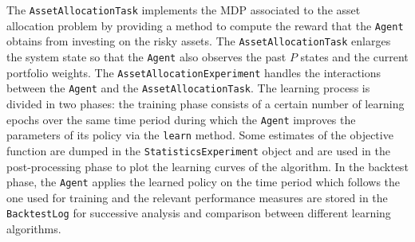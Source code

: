 \clearpage
The \lstinline{AssetAllocationTask} implements the MDP associated to the asset allocation problem by providing a method to compute the reward that the \lstinline{Agent} obtains from investing on the risky assets. The \lstinline{AssetAllocationTask} enlarges the system state so that the \lstinline{Agent} also observes the past $P$ states and the current portfolio weights. 
The \lstinline{AssetAllocationExperiment} handles the interactions between the \lstinline{Agent} and the \lstinline{AssetAllocationTask}. The learning process is divided in two phases: the training phase consists of a certain number of learning epochs over the same time period during which the \lstinline{Agent} improves the parameters of its policy via the \lstinline{learn} method. Some estimates of the objective function are dumped in the \lstinline{StatisticsExperiment} object and are used in the post-processing phase to plot the learning curves of the algorithm. In the backtest phase, the \lstinline{Agent} applies the learned policy on the time period which follows the one used for training and the relevant performance measures are stored in the \lstinline{BacktestLog} for successive analysis and comparison between different learning algorithms.

